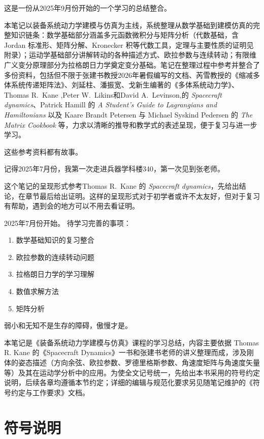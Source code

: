 这是一份从2025年9月份开始的一个学习的总结整合。

本笔记以装备系统动力学建模与仿真为主线，系统整理从数学基础到建模仿真的完整知识链条：数学基础部分涵盖多元函数微积分与矩阵分析（代数基础，含 Jordan 标准形、矩阵分解、Kronecker 积等代数工具，定理与主要性质的证明见附录）；运动学基础部分讲解转动的各种描述方式、欧拉参数与连续转动；有限维广义变分原理部分为拉格朗日力学奠定变分基础。笔记在整理过程中参考并整合了多份资料，包括但不限于张建书教授2026年暑假编写的文档、芮雪教授的《缩减多体系统传递矩阵法》、刘延柱、潘振宽、戈新生编著的《多体系统动力学》、Thomas R.\ Kane ,Peter W.\ Likins和David A.\ Levinson,的 \textit{Spacecraft dynamics}、Patrick Hamill 的 \textit{A Student's Guide to Lagrangians and Hamiltonians} 以及 Kaare Brandt Petersen 与 Michael Syskind Pedersen 的 \textit{The Matrix Cookbook} 等，力求以清晰的推导和教学式的表述呈现，便于复习与进一步学习。

这些参考资料都有故事。

记得2025年7月份，我第一次走进兵器学科楼340，第一次见到张老师。

这个笔记的呈现形式参考Thomas R.\ Kane 的 \textit{Spacecraft dynamics}，先给出结论，在章节最后给出证明。这样的呈现形式对于初学者或许不太友好，但对于复习有帮助，遇到会的地方可以不用去看证明。

2025年7月份开始。
待学习完善的事项：
\begin{enumerate}
    \item 数学基础知识的复习整合
    \item 欧拉参数的连续转动问题
    \item 拉格朗日力学的学习理解
    \item 数值求解方法
    \item 矩阵分析
\end{enumerate}

弱小和无知不是生存的障碍，傲慢才是。

本笔记是《装备系统动力学建模与仿真》课程的学习总结，内容主要依据 Thomas R. Kane 的《Spacecraft Dynamics》一书和张建书老师的讲义整理而成，涉及刚体的姿态描述（方向余弦、欧拉参数、罗德里格斯参数、角速度矩阵与角速度矢量等）及其在运动学分析中的应用。为使全文记号统一，先给出本书采用的符号约定说明，后续各章均遵循本节约定；详细的编辑与规范化要求另见随笔记维护的《符号约定与工作要求》文档。

\section{符号说明}
\label{sec:符号说明}

